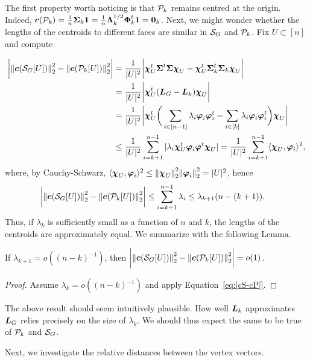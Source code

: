 The first property worth noticing is that $\P_k$ remains  centred at the  origin. Indeed,  $\cent(\P_k) = \frac{1}{n}\Sv_k\one = \frac{1}{n}\Eval_k^{1/2}\Eig_k^\tp\one=\zero_k$.  Next, we might wonder  whether the lengths of the  centroids to different faces  are similar in $\splx_G$ and $\P_k$. Fix  $U\subset [n]$ and compute 

\begin{align*}
\bigg|\norm{\cent(\splx_G[U])}_2^2 - \norm{\cent(\P_k[U])}_2^2\bigg| &= \frac{1}{|U|^2}\bigg| \bchi_U^\tp \Sv^\tp\Sv\bchi_U - \bchi_U^\tp \Sv_k^\tp\Sv_k\bchi_U \bigg| \\
&= \frac{1}{|U|^2} \bigg|\bchi_U^\tp (\L_G-\L_k)\bchi_U\bigg| \\
&=  \frac{1}{|U|^2} \bigg|\bchi_U^\tp \bigg( \sum_{i\in[n-1]}\lambda_i\vp_i\vp_i^\tp - \sum_{i\in[k]}\lambda_i\vp_i\vp_i^\tp\bigg)\bchi_U\bigg|\\
&\leq  \frac{1}{|U|^2} \sum_{i=k+1}^{n-1}|\lambda_i \bchi_U^\tp \vp_i\vp^\tp\bchi_U |=   \frac{1}{|U|^2} \sum_{i=k+1}^{n-1}\la \bchi_U,\vp_i\ra^2,
\end{align*}
where, by Cauchy-Schwarz, $\la \bchi_U,\vp_i\ra^2 \leq \norm{\bchi_U}_2^2 \norm{\vp_i}_2^2 = |U|^2$, 
hence  
\begin{align}
\bigg|\norm{\cent(\splx_G[U])}_2^2 - \norm{\cent(\P_k[U])}_2^2\bigg| &\leq \sum_{i=k+1}^{n-1}  \lambda_i  \leq \lambda_{k+1} (n-(k+1)). \label{eq:|cS-cP|}
\end{align}
Thus, if $\lambda_k$ is sufficiently small as a function  of $n$ and $k$, the lengths of the centroids are approximately equal. We summarize with  the following Lemma. 

\begin{lemma}
	If $\lambda_{k+1} = o((n-k)^{-1})$, then  $ \bigg|\norm{\cent(\splx_G[U])}_2^2 - \norm{\cent(\P_k[U])}_2^2\bigg| = o(1)$. 
\end{lemma}
\begin{proof}
	Assume $\lambda_k = o((n-k)^{-1})$ and apply Equation~\eqref{eq:|cS-cP|}. 
\end{proof}

\begin{remark}
	The  above result should seem intuitively plausible.  How  well $\L_k$ approximates $\L_G$ relies precisely on the size of $\lambda_k$. We should  thus expect  the same to be  true  of $\P_k$ and  $\splx_G$. 
\end{remark}

Next, we  investigate the relative distances between  the vertex vectors. 

